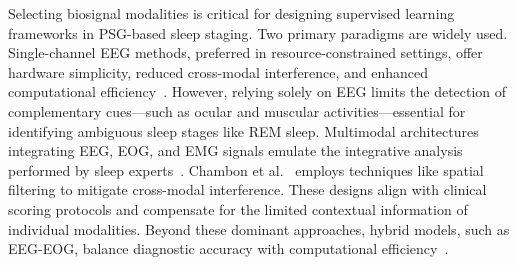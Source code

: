 Selecting biosignal modalities is critical for designing supervised learning frameworks in PSG-based sleep staging. Two primary paradigms are widely used. Single-channel EEG methods, preferred in resource-constrained settings, offer hardware simplicity, reduced cross-modal interference, and enhanced computational efficiency~\cite{tsinalis2016automatic, eldele2021attention}. However, relying solely on EEG limits the detection of complementary cues—such as ocular and muscular activities—essential for identifying ambiguous sleep stages like REM sleep.
Multimodal architectures integrating EEG, EOG, and EMG signals emulate the integrative analysis performed by sleep experts~\cite{chambon2018deep, alvarez2021inter}. Chambon et al.~\cite{chambon2018deep} employs techniques like spatial filtering to mitigate cross-modal interference. These designs align with clinical scoring protocols and compensate for the limited contextual information of individual modalities. Beyond these dominant approaches, hybrid models, such as EEG-EOG, balance diagnostic accuracy with computational efficiency~\cite{Sleep28}. 


